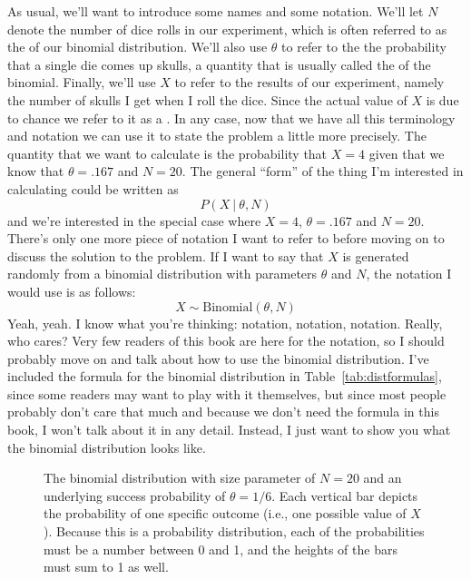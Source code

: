 As usual, we'll want to introduce some names and some notation. We'll let $N$ denote the number of dice rolls in our experiment, which is often referred to as the  of our binomial distribution. We'll also use $\theta$ to refer to the the probability that a single die comes up skulls, a quantity that is usually called the  of the binomial. Finally, we'll use $X$ to refer to the results of our experiment, namely the number of skulls I get when I roll the dice. Since the actual value of $X$ is due to chance we refer to it as a . In any case, now that we have all this terminology and notation we can use it to state the problem a little more precisely. The quantity that we want to calculate is the probability that $X = 4$ given that we know that $\theta = .167$ and $N=20$. The general ``form'' of the thing I'm interested in calculating could be written as 
$$
P(X \ | \ \theta, N)
$$
and we're interested in the special case where $X=4$, $\theta = .167$ and $N=20$. 
There's only one more piece of notation I want to refer to before moving on to discuss the solution to the problem. If I want to say that $X$ is generated randomly from a binomial distribution with parameters $\theta$ and $N$, the notation I would use is as follows:
$$
X \sim \mbox{Binomial}(\theta, N)
$$ 
Yeah, yeah. I know what you're thinking: notation, notation, notation. Really, who cares? Very few readers of this book are here for the notation, so I should probably move on and talk about how to use the binomial distribution. I've included the formula for the binomial distribution in Table~\ref{tab:distformulas}, since some readers may want to play with it themselves, but since most people probably don't care that much and because we don't need the formula in this book, I won't talk about it in any detail. Instead, I just want to show you what the binomial distribution looks like. 

\begin{figure}[!!htb]
\begin{center}
\caption{The binomial distribution with size parameter of $N=20$ and an underlying success probability of $\theta = 1/6$. Each vertical bar depicts the probability of one specific outcome (i.e., one possible value of $X$). Because this is a probability distribution, each of the probabilities must be a number between 0 and 1, and the heights of the bars must sum to 1 as well.}
\HR
\label{fig:binomial1}
\end{center}
\end{figure}

